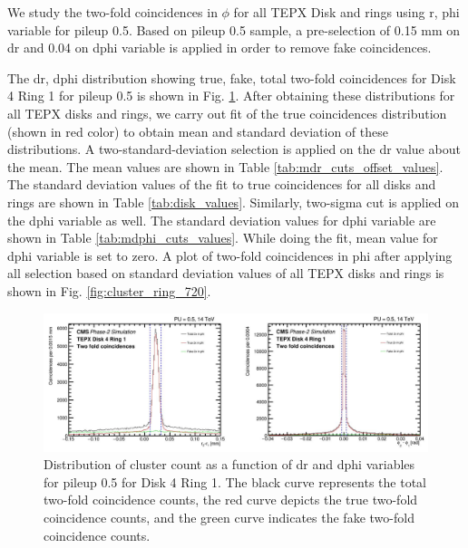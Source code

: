 We study the two-fold coincidences in $\phi$ for all TEPX Disk and rings using r, phi variable for pileup 0.5. Based on pileup 0.5 sample, a pre-selection of 0.15 mm on dr and 0.04 on dphi variable is applied in order to remove fake coincidences. 

The dr, dphi distribution showing true, fake, total two-fold coincidences for Disk 4 Ring 1 for pileup 0.5 is shown in Fig. \ref{fig:cluster_dr_dphi_dist}. After obtaining these distributions for all TEPX disks and rings, we carry out fit of the true coincidences distribution (shown in red color) to obtain mean and standard deviation of these distributions. A two-standard-deviation selection is applied on the dr value about the mean. The mean values are shown in Table \ref{tab:mdr_cuts_offset_values}. The  standard deviation values of the fit to true coincidences for all disks and rings are shown in Table \ref{tab:disk_values}. %
Similarly, two-sigma cut is applied on the dphi variable as well. The standard deviation values for dphi variable are shown in Table \ref{tab:mdphi_cuts_values}. While doing the fit, mean value for dphi variable is set to zero. %
A plot of two-fold coincidences in phi after applying all selection based on standard deviation values of all TEPX disks and rings is shown in Fig. \ref{fig:cluster_ring_720}.

\begin{figure}[H]
\centering
\includegraphics[width=1\textwidth]{ashish_thesis/D4R1_S2_drdphi_cut_2.png}
\caption[Pileup 0.5 Cluster Count in D4R1 vs. dr & dphi]{%
  Distribution of cluster count as a function of dr and dphi variables for pileup 0.5 for Disk 4 Ring 1. The black curve represents the total two-fold coincidence counts, the red curve depicts the true two-fold coincidence counts, and the green curve indicates the fake two-fold coincidence counts.
}
\label{fig:cluster_dr_dphi_dist}
\end{figure}


